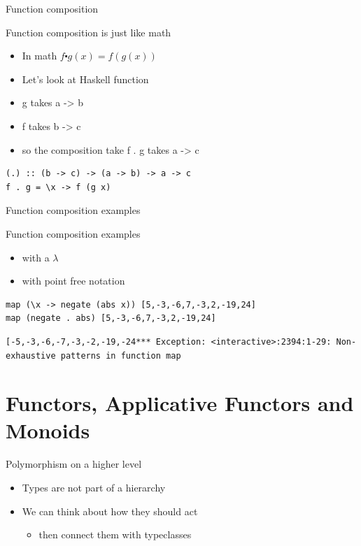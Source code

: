 \documentclass[presetation]{beamer}
\begin{document}
\begin{frame}[fragile,label={sec:org6498a44}]{Function composition}
 \begin{block}{Function composition is just like math}
\begin{itemize}
\item In math  \(f \centerdot g(x) = f(g(x))\)
\item Let's look at Haskell function
\item g takes a -> b
\item f takes b -> c
\end{itemize}
\pause
\begin{itemize}
\item so the composition take f . g takes a -> c
\end{itemize}
\begin{verbatim}
(.) :: (b -> c) -> (a -> b) -> a -> c
f . g = \x -> f (g x)
\end{verbatim}
\end{block}
\end{frame}

\begin{frame}[fragile,label={sec:org7ab8db7}]{Function composition examples}
 \begin{block}{Function composition examples}
\begin{itemize}
\item with a \(\lambda\)
\item with point free notation
\end{itemize}
\begin{verbatim}
map (\x -> negate (abs x)) [5,-3,-6,7,-3,2,-19,24]
map (negate . abs) [5,-3,-6,7,-3,2,-19,24]
\end{verbatim}

\begin{verbatim}
[-5,-3,-6,-7,-3,-2,-19,-24*** Exception: <interactive>:2394:1-29: Non-exhaustive patterns in function map
\end{verbatim}
\end{block}
\end{frame}

\section{Functors, Applicative Functors and Monoids}
\label{sec:org045cc1b}
\begin{frame}[label={sec:org01665b8}]{Polymorphism on a higher level}
\begin{itemize}
\item Types are not part of a hierarchy
\item We can think about how they should act
\begin{itemize}
\item then connect them with typeclasses
\end{itemize}
\end{itemize}
\end{frame}
\end{document}
